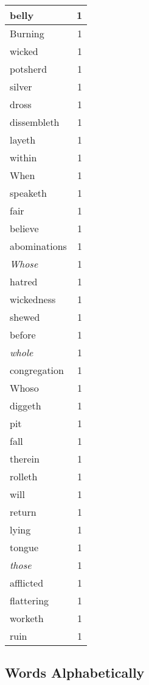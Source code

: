 \begin{center}
\begin{longtable}{l|r}
belly & 1\\ \hline 
Burning & 1\\ \hline 
wicked & 1\\ \hline 
potsherd & 1\\ \hline 
silver & 1\\ \hline 
dross & 1\\ \hline 
dissembleth & 1\\ \hline 
layeth & 1\\ \hline 
within & 1\\ \hline 
When & 1\\ \hline 
speaketh & 1\\ \hline 
fair & 1\\ \hline 
believe & 1\\ \hline 
abominations & 1\\ \hline 
\emph{Whose} & 1\\ \hline 
hatred & 1\\ \hline 
wickedness & 1\\ \hline 
shewed & 1\\ \hline 
before & 1\\ \hline 
\emph{whole} & 1\\ \hline 
congregation & 1\\ \hline 
Whoso & 1\\ \hline 
diggeth & 1\\ \hline 
pit & 1\\ \hline 
fall & 1\\ \hline 
therein & 1\\ \hline 
rolleth & 1\\ \hline 
will & 1\\ \hline 
return & 1\\ \hline 
lying & 1\\ \hline 
tongue & 1\\ \hline 
\emph{those} & 1\\ \hline 
afflicted & 1\\ \hline 
flattering & 1\\ \hline 
worketh & 1\\ \hline 
ruin & 1\\ \hline 
\end{longtable}  
\end{center}  


  
\normalsize  

  
  


\subsection{Words Alphabetically}

